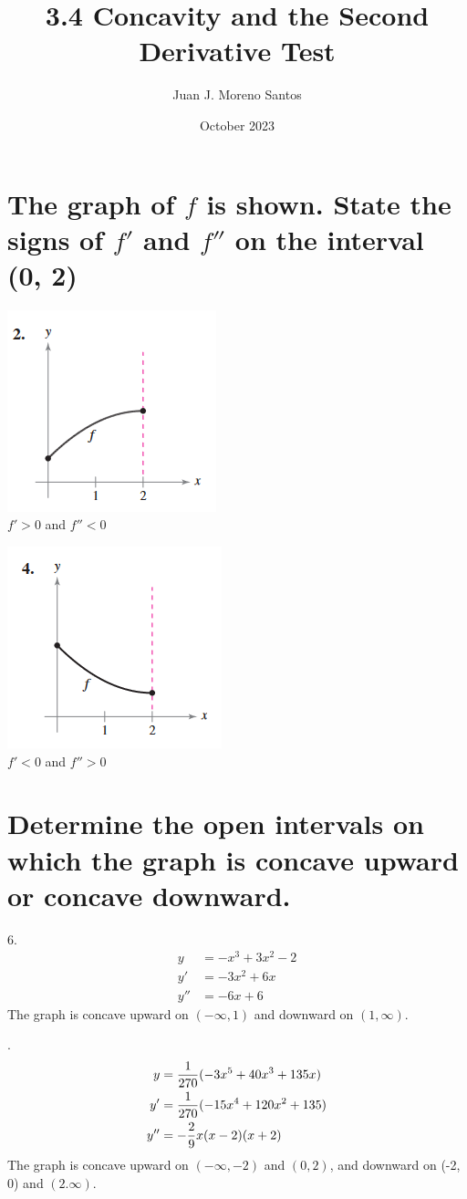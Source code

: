 \documentclass[11pt]{article}
\title{3.4 Concavity and the Second Derivative Test}
\author{Juan J. Moreno Santos}
\date{October 2023}
\newcommand*{\vs}{\vspace{1cm}}
\newcommand*{\next}{\noindent}
\newcommand*{\set}{\setcounter{equation}{0}}
\begin{document}
\maketitle

\section{The graph of $f$ is shown. State the signs of $f'$ and $f''$ on the interval (0, 2)}
\includegraphics{2.png}\\
$f'>0$ and $f''<0$

\next
\includegraphics{4.png}\\
$f'<0$ and $f''>0$

\section{Determine the open intervals on which the graph is concave upward or concave downward.}
6.\begin{align}
    y&=-x^3+3x^2-2\\
    y'&=-3x^2+6x\\
    y''&=-6x+6
\end{align}
The graph is concave upward on $(-\infty, 1)$ and downward on $(1, \infty)$.

\vs
\next
14.\begin{align}
    \set
    y&=\frac{1}{270}(-3x^5+40x^3+135x)\\
    y'&=\frac{1}{270}(-15x^4+120x^2+135)\\
    y''&=-\frac{2}{9}x(x-2)(x+2)
\end{align}
The graph is concave upward on $(-\infty, -2)$ and $(0, 2)$, and downward on (-2, 0) and $(2. \infty)$.
\end{document}
